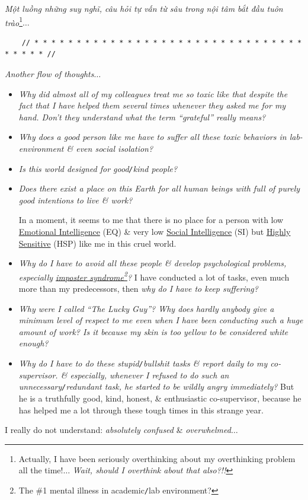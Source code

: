 \documentclass[12pt]{article}
\begin{document}
{\it Một luồng những suy nghĩ, câu hỏi tự vấn từ sâu trong nội tâm bắt đầu tuôn trào}\footnote{Actually, I have been seriously overthinking about my overthinking problem all the time!$\ldots$ {\it Wait, should I overthink about that also?!!}}$\ldots$

\begin{verbatim}
	// * * * * * * * * * * * * * * * * * * * * * * * * * * * * * * * * * * * * * //
\end{verbatim}

\noindent
{} {\it Another flow of thoughts}$\ldots$
\begin{itemize}
	\setlength\itemsep{0em}
	\item {\it Why did almost all of my colleagues treat me so toxic like that despite the fact that I have helped them several times whenever they asked me for my hand. Don't they understand what the term ``grateful'' really means?}
	\item {\it Why does a good person like me have to suffer all these toxic behaviors in lab-environment \& even social isolation?}
	\item {\it Is this world designed for good{\tt/}kind people?}
	\item {\it Does there exist a place on this Earth for all human beings with full of purely good intentions to live \& work?}
	
	In a moment, it seems to me that there is no place for a person with low \href{https://en.wikipedia.org/wiki/Emotional_intelligence}{Emotional Intelligence} (EQ) \& very low \href{https://en.wikipedia.org/wiki/Social_intelligence}{Social Intelligence} (SI) but \href{https://hsperson.com/}{Highly Sensitive} (HSP) like me in this cruel world.    
	\item {\it Why do I have to avoid all these people \& develop psychological problems, especially \href{https://en.wikipedia.org/wiki/Impostor_syndrome}{imposter syndrome}\footnote{The \#1 mental illness in academic{\tt/}lab environment?}?} I have conducted a lot of tasks, even much more than my predecessors, then {\it why do I have to keep suffering?}
	\item {\it Why were I called ``The Lucky Guy''? Why does hardly anybody give a minimum level of respect to me even when I have been conducting such a huge amount of work? Is it because my skin is too yellow to be considered white enough?}
	\item {\it Why do I have to do these stupid{\tt/}bullshit tasks \& report daily to my co-supervisor. \& especially, whenever I refused to do such an unnecessary{\tt/}redundant task, he started to be wildly angry immediately?} But he is a truthfully good, kind, honest, \& enthusiastic co-supervisor, because he has helped me a lot through these tough times in this strange year.
\end{itemize}
I really do not understand: {\it absolutely confused} \& {\it overwhelmed}$\ldots$
\end{document}
